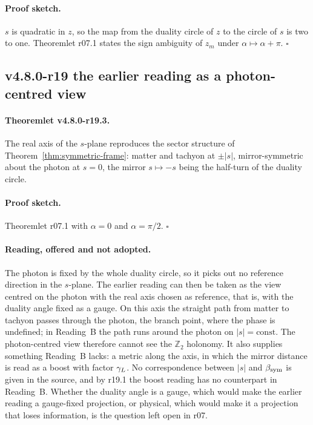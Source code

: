 \paragraph{Proof sketch.}
\(s\) is quadratic in \(z\), so the map from the duality circle of \(z\) to the circle of \(s\) is two to one.
Theoremlet r07.1 states the sign ambiguity of \(z_m\) under \(\alpha\mapsto\alpha+\pi\).  \(\square\)

\subsection*{v4.8.0-r19 the earlier reading as a photon-centred view}
\label{subsec:v480-r19-photon-centred}

\paragraph{Theoremlet v4.8.0-r19.3.}
The real axis of the \(s\)-plane reproduces the sector structure of Theorem~\ref{thm:symmetric-frame}: matter and
tachyon at \(\pm|s|\), mirror-symmetric about the photon at \(s=0\), the mirror \(s\mapsto-s\) being the half-turn of
the duality circle.

\paragraph{Proof sketch.}
Theoremlet r07.1 with \(\alpha=0\) and \(\alpha=\pi/2\).  \(\square\)

\paragraph{Reading, offered and not adopted.}
The photon is fixed by the whole duality circle, so it picks out no reference direction in the \(s\)-plane.  The
earlier reading can then be taken as the view centred on the photon with the real axis chosen as reference, that is,
with the duality angle fixed as a gauge.  On this axis the straight path from matter to tachyon passes through the
photon, the branch point, where the phase is undefined; in Reading~B the path runs around the photon on
\(|s|=\mathrm{const}\).  The photon-centred view therefore cannot see the \(\mathbb Z_2\) holonomy.  It also supplies
something Reading~B lacks: a metric along the axis, in which the mirror distance is read as a boost with factor
\(\gamma_L\).  No correspondence between \(|s|\) and \(\beta_{\mathrm{sym}}\) is given in the source, and by r19.1 the boost reading has no
counterpart in Reading~B.  Whether the duality angle is a gauge, which would make the earlier reading a gauge-fixed
projection, or physical, which would make it a projection that loses information, is the question left open in r07.


